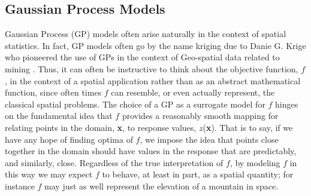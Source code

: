 \documentclass[12pt]{article}
\begin{document}
	\subsection{Gaussian Process Models}
	
	Gaussian Process (GP) models often arise naturally in the context of spatial statistics. 
	In fact, GP models often go by the name kriging due to Danie G. Krige who pioneered the use of GPs in the context of Geo-spatial data related to mining \cite{kriging}.
	Thus, it can often be instructive to think about the objective function, $f$, in the context of a spatial application rather than as an abstract mathematical function, since often times $f$ can resemble, or even actually represent, the classical spatial problems. 
	The choice of a GP as a surrogate model for $f$ hinges on the fundamental idea that $f$ provides a reasonably smooth mapping for relating points in the domain, \textbf{x}, to response values, $z$(\textbf{x}). 
	That is to say, if we have any hope of finding optima of $f$, we impose the idea that points close together in the domain should have values in the response that are predictably, and similarly, close.
	Regardless of the true interpretation of $f$, by modeling $f$ in this way we may expect $f$ to behave, at least in part, as a spatial quantity; for instance $f$ may just as well represent the elevation of a mountain in space. 
	
	
\end{document}
